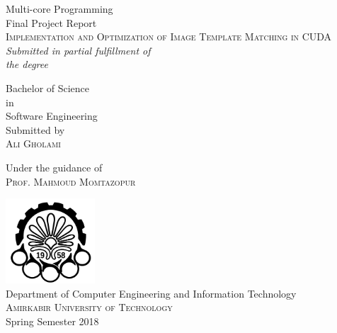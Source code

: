 \begin{titlepage}

\begin{center}

\textup{\large {\sc Multi-core Programming} \\ \sc \small{Final Project Report}}\\[0.4in]

\Large \textsc {Implementation and Optimization of Image Template Matching in CUDA}\\[0.5in]

\vspace{0.1in}
       \small \emph{Submitted in partial fulfillment of\\
        the degree}
        \vspace{.2in}

       {\sc Bachelor of Science \\in\\ Software Engineering}\\[0.5in]

\vspace{0.3in}
\normalsize Submitted by\\
\vspace{0.06in}
\textsc{\large Ali Gholami}

\vspace{.3in}
Under the guidance of\\
\vspace{0.06in}
\textsc{\large Prof. Mahmoud Momtazopur}

\vfill

\includegraphics[width=0.25\textwidth]{nitc-logo}\\[0.1in]
\normalsize{Department of Computer Engineering and Information Technology}\\
\normalsize
\textsc{Amirkabir University of Technology}\\
\vspace{0.5cm}
Spring Semester 2018

\end{center}

\end{titlepage}
